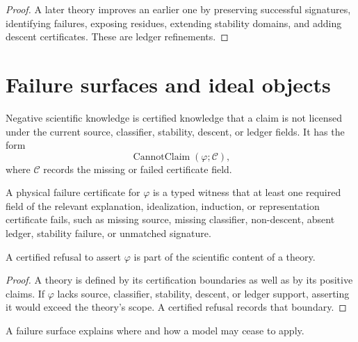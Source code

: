 \begin{proof}
A later theory improves an earlier one by preserving successful signatures, identifying failures, exposing residues, extending stability domains, and adding descent certificates. These are ledger refinements.
\end{proof}

\section{Failure surfaces and ideal objects}
\label{sec:failure-surfaces-ideal-objects}

\begin{definition}
\label{def:negative-scientific-knowledge}
Negative scientific knowledge is certified knowledge that a claim is not licensed under the current source, classifier, stability, descent, or ledger fields. It has the form
$$
\operatorname{CannotClaim}(\varphi;\mathcal C),
$$
where $\mathcal C$ records the missing or failed certificate field.
\end{definition}

\begin{definition}
\label{def:physical-failure-certificate}
A physical failure certificate for $\varphi$ is a typed witness that at least one required field of the relevant explanation, idealization, induction, or representation certificate fails, such as missing source, missing classifier, non-descent, absent ledger, stability failure, or unmatched signature.
\end{definition}

\begin{theorem}
\label{thm:negative-knowledge-scientific-content}
A certified refusal to assert $\varphi$ is part of the scientific content of a theory.
\end{theorem}

\begin{proof}
A theory is defined by its certification boundaries as well as by its positive claims. If $\varphi$ lacks source, classifier, stability, descent, or ledger support, asserting it would exceed the theory's scope. A certified refusal records that boundary.
\end{proof}

\begin{corollary}
\label{cor:failure-surfaces-explanatory}
A failure surface explains where and how a model may cease to apply.
\end{corollary}

